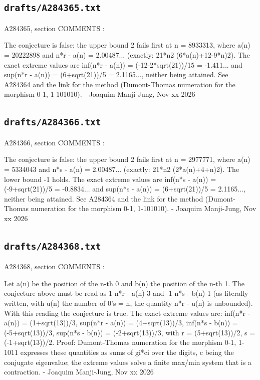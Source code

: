 \subsection*{\texttt{drafts/A284365.txt}}
{\small\raggedright\ttfamily
A284365, section COMMENTS :\par
\par
The conjecture is false: the upper bound 2 fails first at n = 8933313, where a(n) = 20222898 and n*r - a(n) = 2.00487... (exactly: 21*n2  (6*a(n)+12-9*n)2). The exact extreme values are inf(n*r - a(n)) = (-12-2*sqrt(21))/15 = -1.411... and sup(n*r - a(n)) = (6+sqrt(21))/5 = 2.1165..., neither being attained. See A284364 and the link for the method (Dumont-Thomas numeration for the morphism 0-1, 1-101010). - Joaquim Manji-Jung, Nov xx 2026\par
}
\subsection*{\texttt{drafts/A284366.txt}}
{\small\raggedright\ttfamily
A284366, section COMMENTS :\par
\par
The conjecture is false: the upper bound 2 fails first at n = 2977771, where a(n) = 5334043 and n*s - a(n) = 2.00487... (exactly: 21*n2  (2*a(n)+4+n)2). The lower bound -1 holds. The exact extreme values are inf(n*s - a(n)) = (-9+sqrt(21))/5 = -0.8834... and sup(n*s - a(n)) = (6+sqrt(21))/5 = 2.1165..., neither being attained. See A284364 and the link for the method (Dumont-Thomas numeration for the morphism 0-1, 1-101010). - Joaquim Manji-Jung, Nov xx 2026\par
}
\subsection*{\texttt{drafts/A284368.txt}}
{\small\raggedright\ttfamily
A284368, section COMMENTS :\par
\par
Let a(n) be the position of the n-th 0 and b(n) the position of the n-th 1. The conjecture above must be read as 1  n*r - a(n)  3 and -1  n*s - b(n)  1 (as literally written, with u(n) the number of 0's = n, the quantity n*r - u(n) is unbounded). With this reading the conjecture is true. The exact extreme values are: inf(n*r - a(n)) = (1+sqrt(13))/3, sup(n*r - a(n)) = (4+sqrt(13))/3, inf(n*s - b(n)) = (-5+sqrt(13))/3, sup(n*s - b(n)) = (-2+sqrt(13))/3, with r = (5+sqrt(13))/2, s = (-1+sqrt(13))/2. Proof: Dumont-Thomas numeration for the morphism 0-1, 1-1011 expresses these quantities as sums of gi*ci over the digits, c being the conjugate eigenvalue; the extreme values solve a finite max/min system that is a contraction. - Joaquim Manji-Jung, Nov xx 2026\par
}
